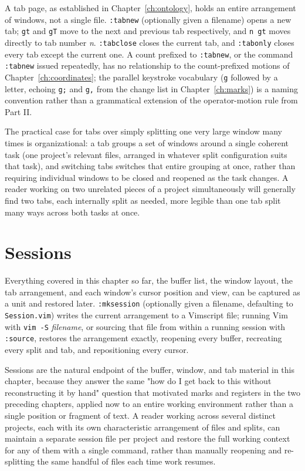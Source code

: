 A tab page, as established in Chapter~\ref{ch:ontology}, holds an entire arrangement of windows, not a single file. \texttt{:tabnew} (optionally given a filename) opens a new tab; \texttt{gt} and \texttt{gT} move to the next and previous tab respectively, and \texttt{n gt} moves directly to tab number \textit{n}. \texttt{:tabclose} closes the current tab, and \texttt{:tabonly} closes every tab except the current one. A count prefixed to \texttt{:tabnew}, or the command \texttt{:tabnew} issued repeatedly, has no relationship to the count-prefixed motions of Chapter~\ref{ch:coordinates}; the parallel keystroke vocabulary (\texttt{g} followed by a letter, echoing \texttt{g;} and \texttt{g,} from the change list in Chapter~\ref{ch:marks}) is a naming convention rather than a grammatical extension of the operator-motion rule from Part II.

The practical case for tabs over simply splitting one very large window many times is organizational: a tab groups a set of windows around a single coherent task (one project's relevant files, arranged in whatever split configuration suits that task), and switching tabs switches that entire grouping at once, rather than requiring individual windows to be closed and reopened as the task changes. A reader working on two unrelated pieces of a project simultaneously will generally find two tabs, each internally split as needed, more legible than one tab split many ways across both tasks at once.

\section{Sessions}

Everything covered in this chapter so far, the buffer list, the window layout, the tab arrangement, and each window's cursor position and view, can be captured as a unit and restored later. \texttt{:mksession} (optionally given a filename, defaulting to \texttt{Session.vim}) writes the current arrangement to a Vimscript file; running Vim with \texttt{vim -S} \textit{filename}, or sourcing that file from within a running session with \texttt{:source}, restores the arrangement exactly, reopening every buffer, recreating every split and tab, and repositioning every cursor.

Sessions are the natural endpoint of the buffer, window, and tab material in this chapter, because they answer the same "how do I get back to this without reconstructing it by hand" question that motivated marks and registers in the two preceding chapters, applied now to an entire working environment rather than a single position or fragment of text. A reader working across several distinct projects, each with its own characteristic arrangement of files and splits, can maintain a separate session file per project and restore the full working context for any of them with a single command, rather than manually reopening and re-splitting the same handful of files each time work resumes.

